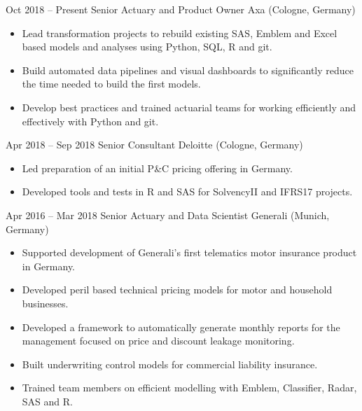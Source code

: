 \documentclass[a4paper,]{fortysecondscv}
\begin{document}
	\begin{cvtable}[4]

		\cvitem
			{Oct 2018 -- Present}
			{Senior Actuary and Product Owner}
			{Axa (Cologne, Germany)}
			{
				\vspace{-\topsep}
				\begin{itemize}[nosep, leftmargin=0pt] %
					\item Lead transformation projects to rebuild existing SAS, Emblem and Excel based models and analyses using Python, SQL, R and git.
					\item Build automated data pipelines and visual dashboards to significantly reduce the time needed to build the first models.
					\item Develop best practices and trained actuarial teams for working efficiently and effectively with Python and git.
				\end{itemize}
			}
		\cvitem
			{Apr 2018 -- Sep 2018}
			{Senior Consultant}
			{Deloitte (Cologne, Germany)}
			{
				\vspace{-\topsep}
				\begin{itemize}[nosep, leftmargin=0pt] %
  					\item Led preparation of an initial P\&C pricing offering in Germany.
  					\item Developed tools and tests in R and SAS for SolvencyII and IFRS17 projects.
				\end{itemize}
			}
		\cvitem
			{Apr 2016 -- Mar 2018}
			{Senior Actuary and Data Scientist}
			{Generali (Munich, Germany)}
			{				
				\vspace{-\topsep}
				\begin{itemize}[nosep, leftmargin=0pt] %
					\item Supported development of Generali’s first telematics motor insurance product in Germany.
					\item Developed peril based technical pricing models for motor and household businesses.
					\item Developed a framework to automatically generate monthly reports for the management focused on price and discount leakage monitoring.
					\item Built underwriting control models for commercial liability insurance.
					\item Trained team members on efficient modelling with Emblem, Classifier, Radar, SAS and R.

\end{itemize}}
\end{cvtable}
\end{document}
